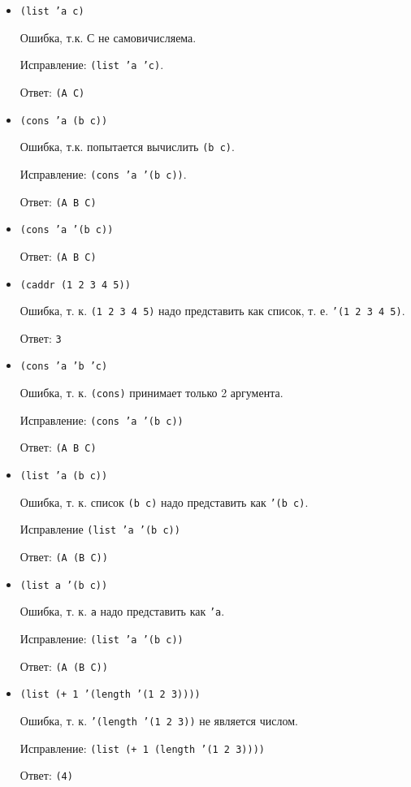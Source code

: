 \begin{itemize}
	\item \texttt{(list 'a c)}
	
	Ошибка, т.к. С не самовичисляема. 
	
	Исправление: \texttt{(list 'a 'c)}. 
	
	Ответ: \texttt{(A C)}
	
	\item \texttt{(cons 'a (b c))}
	
	Ошибка, т.к. попытается вычислить \texttt{(b c)}. 
	
	Исправление: \texttt{(cons 'a '(b c))}. 
	
	Ответ: \texttt{(A B C)}
	
	\item \texttt{(cons 'a '(b c))}
	
	Ответ: \texttt{(A B C)}
	\item \texttt{(caddr (1 2 3 4 5))}
	
	Ошибка, т. к. \texttt{(1 2 3 4 5)} надо представить как список, т. е. \texttt{'(1 2 3 4 5)}.
	
	Ответ: \texttt{3}
	
	\item \texttt{(cons 'a 'b 'c)}
	
	Ошибка, т. к. \texttt{(cons)} принимает только 2 аргумента.
	
	Исправление: \texttt{(cons 'a '(b c))}
	
	Ответ: \texttt{(A B C)}
		
	\item \texttt{(list 'a (b c))}
	
	Ошибка, т. к. список \texttt{(b c)} надо представить как \texttt{'(b c)}.
	
	Исправление \texttt{(list 'a '(b c))}
	
	Ответ: \texttt{(A (B C))}
	
	\item \texttt{(list a '(b c))}
	
	Ошибка, т. к. \texttt{a} надо представить как \texttt{'a}.
	
	Исправление: \texttt{(list 'a '(b c))}
	
	Ответ: \texttt{(A (B C))}
	
	\item \texttt{(list (+ 1 '(length '(1 2 3))))}
	
	Ошибка, т. к. \texttt{'(length '(1 2 3))} не является числом.
	
	Исправление: \texttt{(list (+ 1 (length '(1 2 3))))}
	
	Ответ: \texttt{(4)}
\end{itemize}

